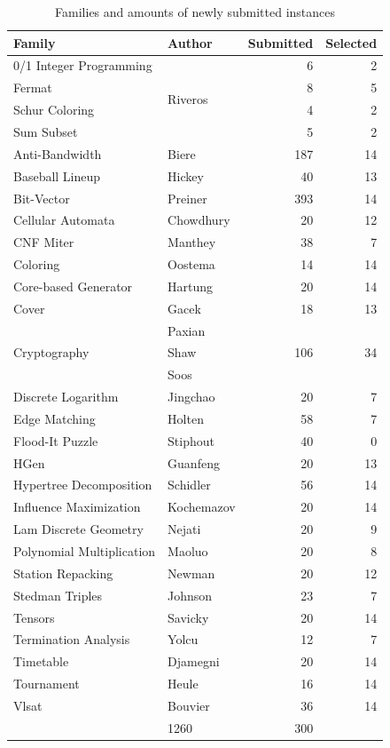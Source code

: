 \documentclass{elsarticle}
\begin{document}
\begin{table}[t]
\centering\small
\begin{tabular}{llrr}
\bf Family & \bf Author & \bf Submitted & \bf Selected\\
\hline\arrayrulecolor{lightgray}
0/1 Integer Programming & \multirow{4}{*}{Riveros} & 6 & 2 \\
Fermat &  & 8 & 5 \\
Schur Coloring &  & 4 & 2 \\
Sum Subset &  & 5 & 2 \\
\hline
Anti-Bandwidth & Biere & 187 & 14 \\
Baseball Lineup & Hickey & 40 & 13 \\
Bit-Vector & Preiner & 393 & 14 \\
Cellular Automata & Chowdhury & 20 & 12 \\
CNF Miter & Manthey & 38 & 7 \\
Coloring & Oostema & 14 & 14 \\
Core-based Generator & Hartung & 20 & 14 \\
Cover & Gacek & 18 & 13 \\
\hline
\multirow{3}{*}{Cryptography} & Paxian & \multirow{3}{*}{106} & \multirow{3}{*}{34} \\
 & Shaw &  &  \\
 & Soos &  &  \\
\hline
Discrete Logarithm & Jingchao & 20 & 7 \\
Edge Matching & Holten & 58 & 7 \\
Flood-It Puzzle & Stiphout & 40 & 0 \\
HGen & Guanfeng & 20 & 13 \\
Hypertree Decomposition & Schidler & 56 & 14 \\
Influence Maximization & Kochemazov & 20 & 14 \\
Lam Discrete Geometry & Nejati & 20 & 9 \\
Polynomial Multiplication & Maoluo & 20 & 8 \\
Station Repacking & Newman & 20 & 12 \\
Stedman Triples & Johnson & 23 & 7 \\
Tensors & Savicky & 20 & 14 \\
Termination Analysis & Yolcu & 12 & 7 \\
Timetable & Djamegni & 20 & 14 \\
Tournament & Heule & 16 & 14 \\
Vlsat & Bouvier & 36 & 14 \\
\arrayrulecolor{black}
\hline
\multicolumn{2}{r}{$\Sigma$} & 1260 & 300
\end{tabular}
\caption{Families and amounts of newly submitted instances}
\label{tab:families}
\end{table}
\end{document}
